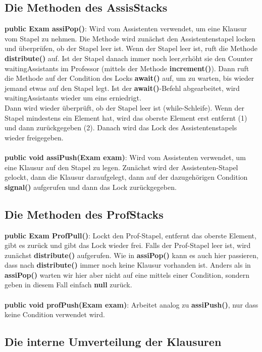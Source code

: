 \documentclass[12pt,a4paper]{article}
\begin{document}
\subsection{Die Methoden des AssisStacks}

\textbf{public Exam assiPop()}: Wird vom Assistenten verwendet, um eine Klausur vom Stapel zu nehmen. Die Methode wird zunächst den Assistentenstapel locken und überprüfen, ob der Stapel leer ist. Wenn der Stapel leer ist, ruft die Methode \textbf{distribute()} auf. Ist der Stapel danach immer noch leer,erhöht sie den Counter waitingAssistants im Professor (mittels der Methode \textbf{increment()}). Dann ruft die Methode auf der Condition des Locks \textbf{await()} auf, um zu warten, bis wieder jemand etwas auf den Stapel legt. Ist der \textbf{await()}-Befehl abgearbeitet, wird waitingAssistants wieder um eins erniedrigt.\\ Dann wird wieder überprüft, ob der Stapel leer ist (while-Schleife). Wenn der Stapel mindestens ein Element hat, wird das oberste Element erst entfernt (1) und dann zurückgegeben (2). Danach wird das Lock des Assistentenstapels wieder freigegeben.\\
\\
\textbf{public void assiPush(Exam exam)}: Wird vom Assistenten verwendet, um eine Klausur auf den Stapel zu legen. Zunächst wird der Assistenten-Stapel gelockt, dann die Klausur daraufgelegt, dann auf der dazugehörigen Condition \textbf{signal()} aufgerufen und dann das Lock zurückgegeben.

\subsection{Die Methoden des ProfStacks}

\textbf{public Exam ProfPull()}: Lockt den Prof-Stapel, entfernt das oberste Element, gibt es zurück und gibt das Lock wieder frei. Falls der Prof-Stapel leer ist, wird zunächst \textbf{distribute()} aufgerufen. Wie in \textbf{assiPop()} kann es auch hier passieren, dass nach \textbf{distribute()} immer noch keine Klausur vorhanden ist. Anders als in \textbf{assiPop()} warten wir hier aber nicht auf eine mittels einer Condition, sondern geben in diesem Fall einfach \textbf{null} zurück.\\
\\
\textbf{public void profPush(Exam exam)}: Arbeitet analog zu \textbf{assiPush()}, nur dass keine Condition verwendet wird.

\subsection{Die interne Umverteilung der Klausuren}
\end{document}
